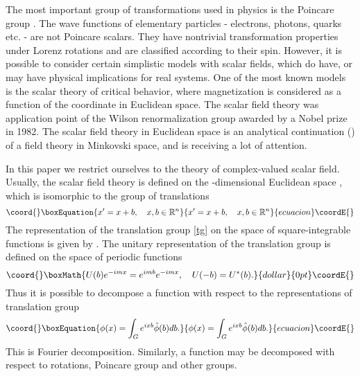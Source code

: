 \documentclass[a4paper,a4paper]{article}
\providecommand{\R}{\mathbb{R}}
\begin{document}
The most important group of transformations used in physics is the 
Poincare group \coordHE{}. The wave 
functions of elementary particles - electrons, photons, quarks etc. - 
are not Poincare scalars. They have nontrivial transformation properties 
under Lorenz rotations \myHighlight{$\Lambda_\mu^\nu$}\coordHE{} and are classified according 
to their spin. However, it is possible to consider certain simplistic 
models with scalar fields, which do have, or may have physical implications 
for real systems. One of the most known models is the scalar theory of 
critical behavior, where magnetization \coordHE{} is considered as a 
function of the coordinate in Euclidean space. The scalar field theory 
was application point of the Wilson renormalization group awarded by a 
Nobel prize in 1982. The scalar field theory in Euclidean space 
is an analytical continuation (\coordHE{}) of a field theory in 
Minkovski space, and is receiving a lot of attention.

In this paper we restrict ourselves to the theory of complex-valued 
scalar field. Usually, the scalar field theory is defined on the 
\coordHE{}-dimensional Euclidean space \myHighlight{$\R^n$}\coordHE{}, which is isomorphic to the group 
of translations 
\begin{equation}\coord{}\boxEquation{
x' = x+b,\quad x,b \in \R^n
\label{tg}
}{
x' = x+b,\quad x,b \in \R^n
}{ecuacion}\coordE{}\end{equation}
The representation of the translation group \eqref{tg} on the space 
of square-integrable functions is given by 
\coordHE{}.
The unitary representation of the translation group is defined 
on the space of periodic functions 
$$\coord{}\boxMath{U(b) e^{-imx} = e^{imb} e^{-imx},\quad  U(-b) = U^*(b).}{dollar}{0pt}\coordE{}$$
Thus it is possible to decompose a function \coordHE{} with 
respect to the representations of translation group \coordHE{}
\begin{equation}\coord{}\boxEquation{
\phi(x) = \int_G e^{ixb} \hat \phi(b) db.
\label{ft} 
}{
\phi(x) = \int_G e^{ixb} \hat \phi(b) db.
}{ecuacion}\coordE{}\end{equation}
This is Fourier decomposition.
Similarly, a function may be decomposed with respect to \coordHE{} rotations, 
Poincare group \cite{Klauder} and other groups. 
\end{document}
